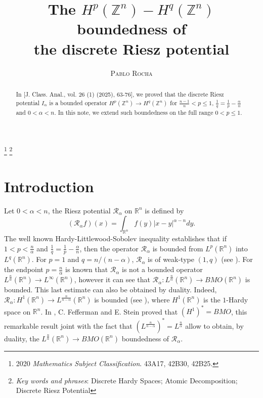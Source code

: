 \documentclass[leqno,12pt]{article} %
\title{The $H^p(\mathbb{Z}^n) - H^q(\mathbb{Z}^n)$ boundedness of \\ the discrete Riesz potential} %
\author{
%
%
\textsc{Pablo Rocha} %
}
\date{} %
\theoremstyle{plain} %
\theoremstyle{definition} %
\begin{document}
\maketitle

\footnote{ %
2020 \textit{Mathematics Subject Classification}.
43A17, 42B30, 42B25.
}
\footnote{ %
\textit{Key words and phrases}:
Discrete Hardy Spaces; Atomic Decomposition; Discrete Riesz Potential
}



\begin{abstract}
In [J. Class. Anal., vol. 26 (1) (2025), 63-76], we proved that the discrete Riesz potential $I_{\alpha}$ is a bounded operator 
$H^p(\mathbb{Z}^n) \to H^q(\mathbb{Z}^n)$ for $\frac{n-1}{n} < p \leq 1$, $\frac{1}{q} = \frac{1}{p} - \frac{\alpha}{n}$ and 
$0 < \alpha < n$. In this note, we extend such boundedness on the full range $0 < p \leq 1$. 
\end{abstract}


\section{Introduction}

Let $0 < \alpha < n$, the Riesz potential $\mathcal{R}_{\alpha}$ on $\mathbb{R}^n$ is defined by
\begin{equation} \label{Ralfa}
(\mathcal{R}_{\alpha} f)(x) = \int_{\mathbb{R}^n} f(y) |x-y|^{\alpha-n} dy.
\end{equation}
The well known Hardy-Littlewood-Sobolev inequality establishes that if $1 < p < \frac{n}{\alpha}$ and 
$\frac{1}{q} = \frac{1}{p} - \frac{\alpha}{n}$, then the operator $\mathcal{R}_{\alpha}$ is bounded from $L^{p}(\mathbb{R}^n)$ into 
$L^{q}(\mathbb{R}^n)$. For $p=1$ and $q = n/(n-\alpha)$, $\mathcal{R}_{\alpha}$ is of weak-type $(1, q)$ (see \cite{Stein}). For the 
endpoint $p = \frac{n}{\alpha}$ is known that $\mathcal{R}_{\alpha}$ is not a bounded operator 
$L^{\frac{n}{\alpha}}(\mathbb{R}^n) \to L^{\infty}(\mathbb{R}^n)$, however it can see that 
$\mathcal{R}_{\alpha} : L^{\frac{n}{\alpha}}(\mathbb{R}^n) \to BMO(\mathbb{R}^n)$ is bounded. This last estimate can also be obtained 
by duality. Indeed, $\mathcal{R}_{\alpha} : H^1(\mathbb{R}^n) \to L^{\frac{n}{n-\alpha}}(\mathbb{R}^n)$ is bounded (see \cite{Weiss}), 
where $H^1(\mathbb{R}^n)$ is the $1$-Hardy space on $\mathbb{R}^n$. In \cite{Feff}, C. Fefferman and E. Stein proved that $(H^1)^{*} = BMO$, 
this remarkable result joint with the fact that $(L^{\frac{n}{n-\alpha}})^{*} = L^{\frac{n}{\alpha}}$ allow to obtain, by duality, 
the $L^{\frac{n}{\alpha}}(\mathbb{R}^n) \to BMO(\mathbb{R}^n)$ boundedness of $\mathcal{R}_{\alpha}$.
\end{document}

